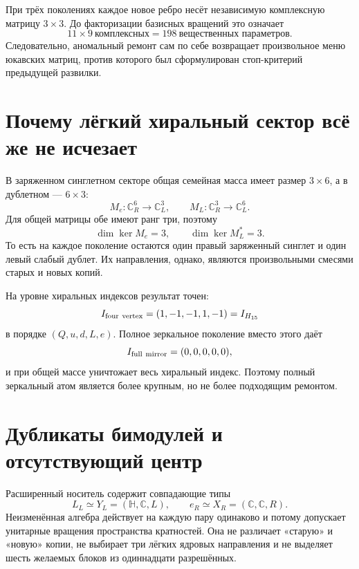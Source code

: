 При трёх поколениях каждое новое ребро несёт независимую комплексную матрицу
$3\times3$. До факторизации базисных вращений это означает
\begin{equation}
 11\times 9\ \text{комплексных}
 =198\ \text{вещественных параметров}.
 \label{eq:v7-vectorlike-raw-yukawa-cost}
\end{equation}
Следовательно, аномальный ремонт сам по себе возвращает произвольное меню
юкавских матриц, против которого был сформулирован стоп-критерий предыдущей
развилки.

\section{Почему лёгкий хиральный сектор всё же не исчезает}

В заряженном синглетном секторе общая семейная масса имеет размер
$3\times6$, а в дублетном --- $6\times3$:
\begin{equation}
 M_e:\mathbb C^6_R\to\mathbb C^3_L,\qquad
 M_L:\mathbb C^3_R\to\mathbb C^6_L.
 \label{eq:v7-vectorlike-mass-shapes}
\end{equation}
Для общей матрицы обе имеют ранг три, поэтому
\begin{equation}
 \dim\ker M_e=3,\qquad
 \dim\ker M_L^*=3.
 \label{eq:v7-vectorlike-kernel-count}
\end{equation}
То есть на каждое поколение остаются один правый заряженный синглет и один
левый слабый дублет. Их направления, однако, являются произвольными смесями
старых и новых копий.

На уровне хиральных индексов результат точен:
\begin{equation}
 I_{\rm four\ vertex}=(1,-1,-1,1,-1)=I_{H_{15}}
 \label{eq:v7-vectorlike-index-preservation}
\end{equation}
в порядке $(Q,u,d,L,e)$. Полное зеркальное поколение вместо этого даёт
\begin{equation}
 I_{\rm full\ mirror}=(0,0,0,0,0),
 \label{eq:v7-vectorlike-full-mirror-index-zero}
\end{equation}
и при общей массе уничтожает весь хиральный индекс. Поэтому полный зеркальный
атом является более крупным, но не более подходящим ремонтом.

\section{Дубликаты бимодулей и отсутствующий центр}

Расширенный носитель содержит совпадающие типы
\begin{equation}
 L_L\simeq Y_L=(\mathbb H,\mathbb C,L),\qquad
 e_R\simeq X_R=(\mathbb C,\mathbb C,R).
 \label{eq:v7-vectorlike-duplicate-types}
\end{equation}
Неизменённая алгебра действует на каждую пару одинаково и потому допускает
унитарные вращения пространства кратностей. Она не различает «старую» и
«новую» копии, не выбирает три лёгких ядровых направления и не выделяет
шесть желаемых блоков из одиннадцати разрешённых.

